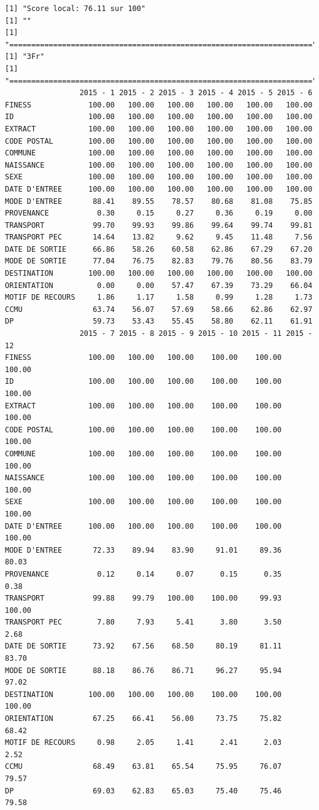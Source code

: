 \documentclass[]{article}
\begin{document}
\begin{verbatim}
[1] "Score local: 76.11 sur 100"
[1] ""
[1] "====================================================================="
[1] "3Fr"
[1] "====================================================================="
                 2015 - 1 2015 - 2 2015 - 3 2015 - 4 2015 - 5 2015 - 6
FINESS             100.00   100.00   100.00   100.00   100.00   100.00
ID                 100.00   100.00   100.00   100.00   100.00   100.00
EXTRACT            100.00   100.00   100.00   100.00   100.00   100.00
CODE POSTAL        100.00   100.00   100.00   100.00   100.00   100.00
COMMUNE            100.00   100.00   100.00   100.00   100.00   100.00
NAISSANCE          100.00   100.00   100.00   100.00   100.00   100.00
SEXE               100.00   100.00   100.00   100.00   100.00   100.00
DATE D'ENTREE      100.00   100.00   100.00   100.00   100.00   100.00
MODE D'ENTREE       88.41    89.55    78.57    80.68    81.08    75.85
PROVENANCE           0.30     0.15     0.27     0.36     0.19     0.00
TRANSPORT           99.70    99.93    99.86    99.64    99.74    99.81
TRANSPORT PEC       14.64    13.82     9.62     9.45    11.48     7.56
DATE DE SORTIE      66.86    58.26    60.58    62.86    67.29    67.20
MODE DE SORTIE      77.04    76.75    82.83    79.76    80.56    83.79
DESTINATION        100.00   100.00   100.00   100.00   100.00   100.00
ORIENTATION          0.00     0.00    57.47    67.39    73.29    66.04
MOTIF DE RECOURS     1.86     1.17     1.58     0.99     1.28     1.73
CCMU                63.74    56.07    57.69    58.66    62.86    62.97
DP                  59.73    53.43    55.45    58.80    62.11    61.91
                 2015 - 7 2015 - 8 2015 - 9 2015 - 10 2015 - 11 2015 - 12
FINESS             100.00   100.00   100.00    100.00    100.00    100.00
ID                 100.00   100.00   100.00    100.00    100.00    100.00
EXTRACT            100.00   100.00   100.00    100.00    100.00    100.00
CODE POSTAL        100.00   100.00   100.00    100.00    100.00    100.00
COMMUNE            100.00   100.00   100.00    100.00    100.00    100.00
NAISSANCE          100.00   100.00   100.00    100.00    100.00    100.00
SEXE               100.00   100.00   100.00    100.00    100.00    100.00
DATE D'ENTREE      100.00   100.00   100.00    100.00    100.00    100.00
MODE D'ENTREE       72.33    89.94    83.90     91.01     89.36     80.03
PROVENANCE           0.12     0.14     0.07      0.15      0.35      0.38
TRANSPORT           99.88    99.79   100.00    100.00     99.93    100.00
TRANSPORT PEC        7.80     7.93     5.41      3.80      3.50      2.68
DATE DE SORTIE      73.92    67.56    68.50     80.19     81.11     83.70
MODE DE SORTIE      88.18    86.76    86.71     96.27     95.94     97.02
DESTINATION        100.00   100.00   100.00    100.00    100.00    100.00
ORIENTATION         67.25    66.41    56.00     73.75     75.82     68.42
MOTIF DE RECOURS     0.98     2.05     1.41      2.41      2.03      2.52
CCMU                68.49    63.81    65.54     75.95     76.07     79.57
DP                  69.03    62.83    65.03     75.40     75.46     79.58
\end{verbatim}
\end{document}
